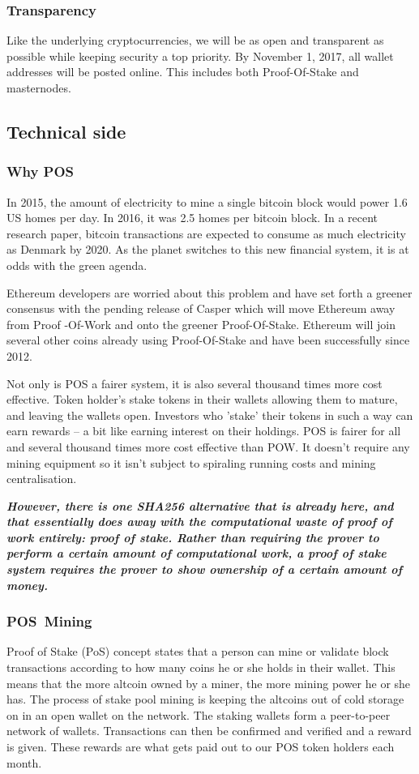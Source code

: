   \subsubsection{Transparency}
Like the underlying cryptocurrencies, we will be as open and transparent as possible while keeping security a top priority. By November 1, 2017, all wallet addresses will be posted online. This includes both Proof-Of-Stake and masternodes.

 \subsection{Technical side}
  \subsubsection{Why POS}
In 2015, the amount of electricity to mine a single bitcoin block would power 1.6 US homes per day. In 2016, it was 2.5 homes per bitcoin block. In a recent research paper, bitcoin transactions are expected to consume as much electricity as Denmark by 2020. As the planet switches to this new financial system, it is at odds with the green agenda.

Ethereum developers are worried about this problem and have set forth a greener consensus with the pending release of Casper which will move Ethereum away from Proof -Of-Work and onto the greener Proof-Of-Stake. Ethereum will join several other coins already using Proof-Of-Stake and have been successfully since 2012.

Not only is POS a fairer system, it is also several thousand times more cost effective. Token holder’s stake tokens in their wallets allowing them to mature, and leaving the wallets open. Investors who ’stake’ their tokens in such a way can earn rewards – a bit like earning interest on their holdings. POS is fairer for all and several thousand times more cost effective than POW. It doesn’t require any mining equipment so it isn’t subject to spiraling running costs and mining centralisation.

\textbf{\emph{However, there is one SHA256 alternative that is already here, and that essentially does away with the computational waste of proof of work entirely: proof of stake. Rather than requiring the prover to perform a certain amount of computational work, a proof of stake system requires the prover to show ownership of a certain amount of money.}} \cite{vbuterin2013}

  \subsubsection{POS Mining}
Proof of Stake (PoS) concept states that a person can mine or validate block transactions according to how many coins he or she holds in their wallet. This means that the more altcoin owned by a miner, the more mining power he or she has. The process of stake pool mining is keeping the altcoins out of cold storage on in an open wallet on the network. The staking wallets form a peer-to-peer network of wallets. Transactions can then be confirmed and verified and a reward is given. These rewards are what gets paid out to our POS token holders each month.

